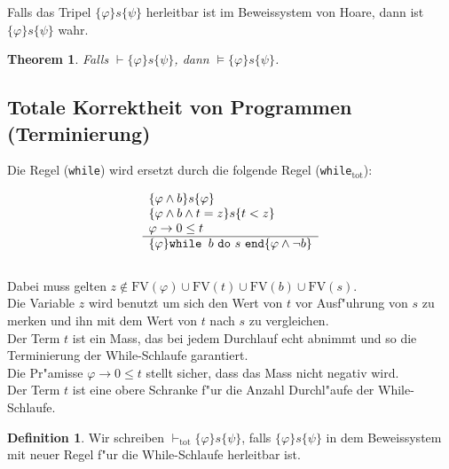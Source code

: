 \documentclass[german,10pt, a4paper, twocolumn]{scrartcl}
\newtheorem{theorem}{Theorem}[section]
\theoremstyle{definition}
\newtheorem{definition}{Definition}[section]
\theoremstyle{remark}
\begin{document}
Falls das Tripel $\{ \varphi \} s \{ \psi \}$ herleitbar ist im Beweissystem von Hoare, dann ist $\{ \varphi \} s \{ \psi \}$ wahr.

\begin{theorem}
	Falls $\vdash \{ \varphi \} s \{ \psi \}$, dann $\vDash \{ \varphi \} s \{ \psi \}$.
\end{theorem}

\subsection{Totale Korrektheit von Programmen (Terminierung)}

Die Regel (\texttt{while}) wird ersetzt durch die folgende Regel (\texttt{while}$_{\mbox{tot}}$):

\begin{displaymath}
	\begin{array}{l}
		\{ \varphi \land b \} s \{ \varphi \} \\
		\{ \varphi \land b \land t = z \} s \{ t < z \}\\
		\varphi \rightarrow 0 \leq t \\
		\hline
		\{ \varphi \} \mbox{\tt{while }} b\ \mbox{\tt{do}}\ s\ \mbox{\tt{end}} \{ \varphi \land \lnot b \}
	\end{array}
\end{displaymath}\\

Dabei muss gelten $z \not \in\mbox{FV}(\varphi) \cup \mbox{FV}(t) \cup \mbox{FV}(b) \cup \mbox{FV}(s)$.\\
Die Variable $z$ wird benutzt um sich den Wert von $t$ vor Ausf"uhrung von $s$ zu merken und ihn mit dem Wert von $t$ nach $s$ zu vergleichen.\\
Der Term $t$ ist ein Mass, das bei jedem Durchlauf echt abnimmt und so die Terminierung der While-Schlaufe garantiert.\\
Die Pr"amisse $\varphi \rightarrow 0 \leq t$ stellt sicher, dass das Mass nicht negativ wird.\\
Der Term $t$ ist eine obere Schranke f"ur die Anzahl Durchl"aufe der While-Schlaufe.\\

\begin{definition}
	Wir schreiben $\vdash_{\mbox{tot}} \{ \varphi \} s \{ \psi \}$, falls $\{ \varphi \} s \{ \psi \}$ in dem Beweissystem mit neuer Regel f"ur die While-Schlaufe herleitbar ist.
\end{definition}
\end{document}
